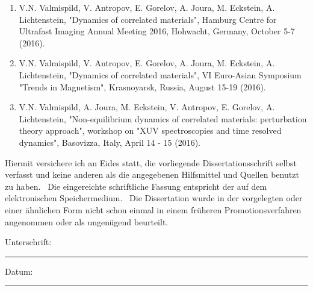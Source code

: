 \documentclass[
12pt, %
english, %
singlespacing, %
liststotoc, %
headsepline, %
]{MastersDoctoralThesis} %
\numberwithin{equation}{section}
\begin{document}
\begin{listofpub}
\begin{enumerate}
    \item V.N. Valmispild, V. Antropov, E. Gorelov, A. Joura, M. Eckstein, A. Lichtenstein, "Dynamics of correlated materials", Hamburg Centre for Ultrafast Imaging Annual Meeting 2016, Hohwacht, Germany, October 5-7 (2016).  
    \item V.N. Valmispild, V. Antropov, E. Gorelov, A. Joura, M. Eckstein, A. Lichtenstein, "Dynamics of correlated materials", VI Euro-Asian Symposium "Trends in Magnetism", Krasnoyarsk, Russia, August 15-19 (2016). 
    \item V.N. Valmispild, A. Joura,  M. Eckstein, V. Antropov, E. Gorelov, A. Lichtenstein, "Non-equilibrium dynamics of correlated materials: perturbation theory approach", workshop on "XUV spectroscopies and time resolved dynamics", Basovizza, Italy, April 14 - 15 (2016).
    \end{enumerate}



\end{listofpub}


\begin{declaration}
\vspace{1cm}
\noindent Hiermit versichere ich an Eides statt, die vorliegende Dissertationsschrift selbst verfasst und 
keine anderen als die angegebenen Hilfsmittel und Quellen benutzt zu haben.\newline~\newline                                                                                                                                                                                                                                                                                                  
\noindent Die  eingereichte  schriftliche  Fassung  entspricht  der  auf  dem  elektronischen  Speichermedium.\newline~\newline
\noindent Die  Dissertation  wurde  in  der  vorgelegten oder  einer  ähnlichen Form nicht  schon  einmal  in
einem früheren Promotionsverfahren angenommen oder als ungenügend beurteilt.

\vspace{1cm}

\noindent Unterschrift:\\
\rule[0.5em]{25em}{0.5pt} %
 
\noindent Datum:\\
\rule[0.5em]{25em}{0.5pt} %
\end{declaration}
\end{document}
